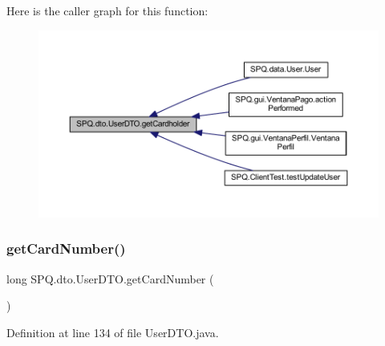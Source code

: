 Here is the caller graph for this function\+:
\nopagebreak
\begin{figure}[H]
\begin{center}
\leavevmode
\includegraphics[width=350pt]{class_s_p_q_1_1dto_1_1_user_d_t_o_a82fe9a242f18d3cb62735cee648e71d9_icgraph}
\end{center}
\end{figure}
\mbox{\label{class_s_p_q_1_1dto_1_1_user_d_t_o_a6ffd8dce998a3e1756aa82e7b2981dd4}} 
\subsubsection{\texorpdfstring{get\+Card\+Number()}{getCardNumber()}}
{\footnotesize\ttfamily long S\+P\+Q.\+dto.\+User\+D\+T\+O.\+get\+Card\+Number (\begin{DoxyParamCaption}{ }\end{DoxyParamCaption})}



Definition at line 134 of file User\+D\+T\+O.\+java.

